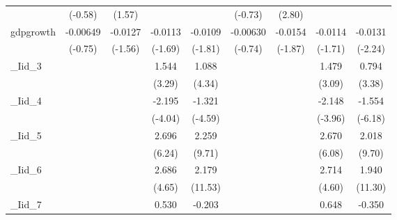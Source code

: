 {\begin{tabular}{l*{8}{c}}
            &     (-0.58)         &      (1.57)         &                     &                     &     (-0.73)         &      (2.80)         &                     &                     \\
[1em]
gdpgrowth   &    -0.00649         &     -0.0127         &     -0.0113         &     -0.0109         &    -0.00630         &     -0.0154         &     -0.0114         &     -0.0131\sym{*}  \\
            &     (-0.75)         &     (-1.56)         &     (-1.69)         &     (-1.81)         &     (-0.74)         &     (-1.87)         &     (-1.71)         &     (-2.24)         \\
[1em]
\_Iid\_3      &                     &                     &       1.544\sym{***}&       1.088\sym{***}&                     &                     &       1.479\sym{**} &       0.794\sym{***}\\
            &                     &                     &      (3.29)         &      (4.34)         &                     &                     &      (3.09)         &      (3.38)         \\
[1em]
\_Iid\_4      &                     &                     &      -2.195\sym{***}&      -1.321\sym{***}&                     &                     &      -2.148\sym{***}&      -1.554\sym{***}\\
            &                     &                     &     (-4.04)         &     (-4.59)         &                     &                     &     (-3.96)         &     (-6.18)         \\
[1em]
\_Iid\_5      &                     &                     &       2.696\sym{***}&       2.259\sym{***}&                     &                     &       2.670\sym{***}&       2.018\sym{***}\\
            &                     &                     &      (6.24)         &      (9.71)         &                     &                     &      (6.08)         &      (9.70)         \\
[1em]
\_Iid\_6      &                     &                     &       2.686\sym{***}&       2.179\sym{***}&                     &                     &       2.714\sym{***}&       1.940\sym{***}\\
            &                     &                     &      (4.65)         &     (11.53)         &                     &                     &      (4.60)         &     (11.30)         \\
[1em]
\_Iid\_7      &                     &                     &       0.530         &      -0.203         &                     &                     &       0.648         &      -0.350         \\

\end{tabular}}
